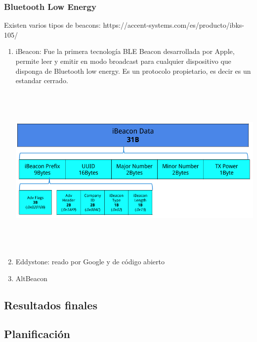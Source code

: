 \documentclass[a4paper ,12pt, onecolumn]{article}
\begin{document}
        \subsubsection {Bluetooth Low Energy}
        Existen varios tipos de beacons:
        https://accent-systems.com/es/producto/ibks-105/
        \begin{enumerate}
            \item iBeacon: Fue la primera tecnología BLE Beacon desarrollada por Apple, permite leer y emitir en modo 
            broadcast para cualquier dispositivo que disponga de Bluetooth low energy. Es un protocolo propietario, es 
            decir es un estandar cerrado. 
        \paragraph{}

            \includegraphics[width=15cm, height=8cm]{tipos_beacon_ibeacon.PNG}
            \paragraph{}
           
            \item Eddystone: reado por Google y de código abierto
            \item AltBeacon
        \end{enumerate}
    \subsection{Resultados finales}
    \subsection{Planificación}
\end{document}
